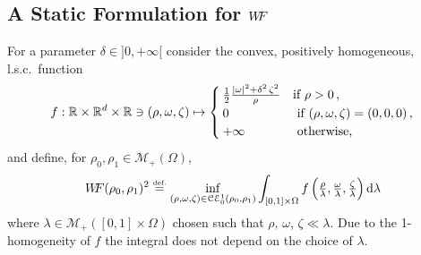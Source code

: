 \subsection[A Static Formulation for WF]{A Static Formulation for $W\! \! F$}
\label{sec:equivalence WF}

\begin{definition}
\label{def:WF}
For a parameter $\delta \in ]0,+\infty[$ consider the convex, positively homogeneous, l.s.c.\ function
\begin{equation}
f : \mathbb{R} \times \mathbb{R}^d \times \mathbb{R} \ni (\rho,\omega, \zeta) \mapsto
\begin{cases}
\frac12 \frac{|\omega|^2+ \delta^2\, \zeta^2}{\rho} & \textnormal{if } \rho>0 \, ,\\
0 & \textnormal{ if } (\rho,\omega,\zeta)=(0,0,0)\, , \\
+ \infty & \textnormal{ otherwise,} 
\end{cases} 
\end{equation}
and define, for $\rho_0,\rho_1 \in \mathcal{M}_+(\Omega)$,
\begin{equation}
	\label{eq:WF}
	W\! \! F(\rho_0,\rho_1)^2 \stackrel{\mbox{\upshape\tiny def.}}{=} 
		\inf_{(\rho,\omega,\zeta) \in \mathcal{CE}_0^1(\rho_0,\rho_1)} \int_{[0,1] \times \Omega}
		f\left( \textstyle{\frac{\rho}{\lambda}},\textstyle{\frac{\omega}{\lambda}},\textstyle{\frac{\zeta}{\lambda}} \right)
		\mathrm{d} \lambda
\end{equation}
where $\lambda \in \mathcal{M}_+([0,1] \times \Omega)$ chosen such that $\rho$, $\omega$, $\zeta \ll \lambda$. Due to the 1-homogeneity of $f$ the integral does not depend on the choice of $\lambda$.
\end{definition}


